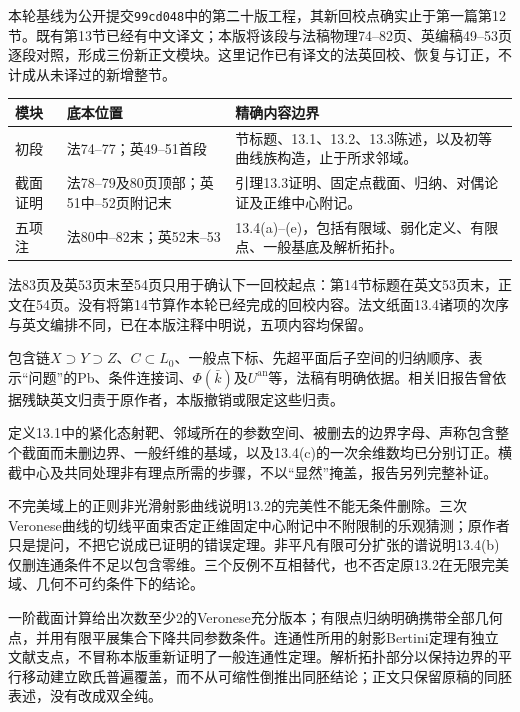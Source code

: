本轮基线为公开提交\texttt{99cd048}中的第二十版工程，其新回校点确实止于第一篇第12节。既有第13节已经有中文译文；本版将该段与法稿物理74--82页、英编稿49--53页逐段对照，形成三份新正文模块。这里记作已有译文的法英回校、恢复与订正，不计成从未译过的新增整节。

\begin{longtable}{@{}p{.18\linewidth}p{.21\linewidth}p{.49\linewidth}@{}}
\toprule 模块 & 底本位置 & 精确内容边界\\\midrule\endhead
初段 & 法74--77；英49--51首段 & 节标题、13.1、13.2、13.3陈述，以及初等曲线族构造，止于所求邻域。\\
截面证明 & 法78--79及80页顶部；英51中--52页附记末 & 引理13.3证明、固定点截面、归纳、对偶论证及正维中心附记。\\
五项注 & 法80中--82末；英52末--53 & 13.4(a)--(e)，包括有限域、弱化定义、有限点、一般基底及解析拓扑。\\
\bottomrule
\end{longtable}

法83页及英53页末至54页只用于确认下一回校起点：第14节标题在英文53页末，正文在54页。没有将第14节算作本轮已经完成的回校内容。法文纸面13.4诸项的次序与英文编排不同，已在本版注释中明说，五项内容均保留。

包含链$X\supset Y\supset Z$、$C\subset L_0$、一般点下标、先超平面后子空间的归纳顺序、表示“问题”的Pb、条件连接词、$\Phi(\bar k)$及$U^{\mathrm{an}}$等，法稿有明确依据。相关旧报告曾依据残缺英文归责于原作者，本版撤销或限定这些归责。

定义13.1中的紧化态射靶、邻域所在的参数空间、被删去的边界字母、声称包含整个截面而未删边界、一般纤维的基域，以及13.4(c)的一次余维数均已分别订正。横截中心及共同处理非有理点所需的步骤，不以“显然”掩盖，报告另列完整补证。

不完美域上的正则非光滑射影曲线说明13.2的完美性不能无条件删除。三次Veronese曲线的切线平面束否定正维固定中心附记中不附限制的乐观猜测；原作者只是提问，不把它说成已证明的错误定理。非平凡有限可分扩张的谱说明13.4(b)仅删连通条件不足以包含零维。三个反例不互相替代，也不否定原13.2在无限完美域、几何不可约条件下的结论。

一阶截面计算给出次数至少2的Veronese充分版本；有限点归纳明确携带全部几何点，并用有限平展集合下降共同参数条件。连通性所用的射影Bertini定理有独立文献支点，不冒称本版重新证明了一般连通性定理。解析拓扑部分以保持边界的平行移动建立欧氏普遍覆盖，而不从可缩性倒推出同胚结论；正文只保留原稿的同胚表述，没有改成双全纯。


